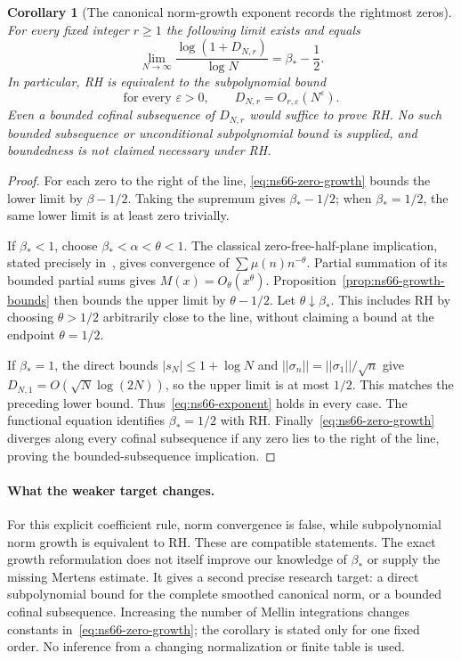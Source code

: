 \documentclass[11pt]{article}
\def\norm#1{||#1||}%
\newtheorem{corollary}[theorem]{Corollary}
\theoremstyle{remark}
\newcommand{\norm}[1]{\left\lVert #1\right\rVert}
\begin{document}
\begin{corollary}[The canonical norm-growth exponent records the rightmost zeros]
\label{cor:ns66-growth-exponent}
For every fixed integer $r\geq1$ the following limit exists and equals
\begin{equation}
 \lim_{N\to\infty}\frac{\log(1+D_{N,r})}{\log N}
                  =\beta_*-\frac12.
 \label{eq:ns66-exponent}
\end{equation}
In particular, RH is equivalent to the subpolynomial bound
\[
 \text{for every }\varepsilon>0,\qquad
 D_{N,r}=O_{r,\varepsilon}(N^\varepsilon).
\]
Even a bounded cofinal subsequence of $D_{N,r}$ would suffice to
prove RH. No such bounded subsequence or unconditional subpolynomial
bound is supplied, and boundedness is not claimed necessary under RH.
\end{corollary}
\begin{proof}
For each zero to the right of the line,
\eqref{eq:ns66-zero-growth} bounds the lower limit by
$\beta-1/2$. Taking the supremum gives $\beta_*-1/2$; when
$\beta_*=1/2$, the same lower limit is at least zero trivially.

If $\beta_*<1$, choose $\beta_*<\alpha<\theta<1$.
The classical zero-free-half-plane implication, stated precisely
in~\cite[Lemma 2.1]{BaezDuarteStrong}, gives convergence of
$\sum\mu(n)n^{-\theta}$. Partial summation of its bounded partial
sums gives $M(x)=O_\theta(x^\theta)$.
Proposition~\ref{prop:ns66-growth-bounds} then bounds the upper
limit by $\theta-1/2$. Let $\theta\downarrow\beta_*$.
This includes RH by choosing $\theta>1/2$ arbitrarily close to the
line, without claiming a bound at the endpoint $\theta=1/2$.

If $\beta_*=1$, the direct bounds $|s_N|\leq1+\log N$ and
$\norm{\sigma_n}=\norm{\sigma_1}/\sqrt n$ give
$D_{N,1}=O(\sqrt N\log(2N))$, so the upper limit is at most
$1/2$. This matches the preceding lower bound.
Thus~\eqref{eq:ns66-exponent} holds in every case.
The functional equation identifies $\beta_*=1/2$ with RH.
Finally~\eqref{eq:ns66-zero-growth} diverges along every cofinal
subsequence if any zero lies to the right of the line, proving the
bounded-subsequence implication.
\end{proof}

\paragraph{What the weaker target changes.}
For this explicit coefficient rule, norm convergence is false, while
subpolynomial norm growth is equivalent to RH. These are compatible
statements. The exact growth reformulation does not itself improve
our knowledge of $\beta_*$ or supply the missing Mertens estimate.
It gives a second precise research target: a direct subpolynomial
bound for the complete smoothed canonical norm, or a bounded cofinal
subsequence. Increasing the number of Mellin integrations changes
constants in~\eqref{eq:ns66-zero-growth}; the corollary is stated
only for one fixed order. No inference from a changing normalization
or finite table is used.
\end{document}
